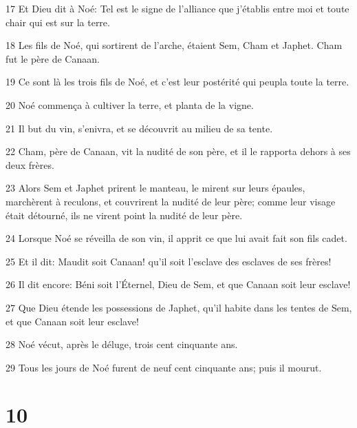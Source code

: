 \par 17 Et Dieu dit à Noé: Tel est le signe de l'alliance que j'établis entre moi et toute chair qui est sur la terre.
\par 18 Les fils de Noé, qui sortirent de l'arche, étaient Sem, Cham et Japhet. Cham fut le père de Canaan.
\par 19 Ce sont là les trois fils de Noé, et c'est leur postérité qui peupla toute la terre.
\par 20 Noé commença à cultiver la terre, et planta de la vigne.
\par 21 Il but du vin, s'enivra, et se découvrit au milieu de sa tente.
\par 22 Cham, père de Canaan, vit la nudité de son père, et il le rapporta dehors à ses deux frères.
\par 23 Alors Sem et Japhet prirent le manteau, le mirent sur leurs épaules, marchèrent à reculons, et couvrirent la nudité de leur père; comme leur visage était détourné, ils ne virent point la nudité de leur père.
\par 24 Lorsque Noé se réveilla de son vin, il apprit ce que lui avait fait son fils cadet.
\par 25 Et il dit: Maudit soit Canaan! qu'il soit l'esclave des esclaves de ses frères!
\par 26 Il dit encore: Béni soit l'Éternel, Dieu de Sem, et que Canaan soit leur esclave!
\par 27 Que Dieu étende les possessions de Japhet, qu'il habite dans les tentes de Sem, et que Canaan soit leur esclave!
\par 28 Noé vécut, après le déluge, trois cent cinquante ans.
\par 29 Tous les jours de Noé furent de neuf cent cinquante ans; puis il mourut.

\chapter{10}

